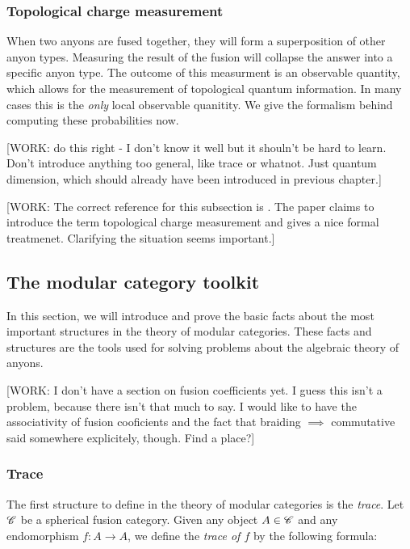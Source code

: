 \subsubsection{Topological charge measurement}

When two anyons are fused together, they will form a superposition of other anyon types. Measuring the result of the fusion will collapse the answer into a specific anyon type. The outcome of this measurment is an observable quantity, which allows for the measurement of topological quantum information. In many cases this is the \textit{only} local observable quanitity. We give the formalism behind computing these probabilities now.

[WORK: do this right - I don't know it well but it shouln't be hard to learn. Don't introduce anything too general, like trace or whatnot. Just quantum dimension, which should already have been introduced in previous chapter.]

[WORK: The correct reference for this subsection is \cite{bonderson2021measuring}. The paper \cite{cong2017universal} claims to introduce the term topological charge measurement and gives a nice formal treatmenet. Clarifying the situation seems important.]
 


\subsection{The modular category toolkit}

In this section, we will introduce and prove the basic facts about the most important structures in the theory of modular categories. These facts and structures are the tools used for solving problems about the algebraic theory of anyons. 

[WORK: I don't have a section on fusion coefficients yet. I guess this isn't a problem, because there isn't that much to say. I would like to have the associativity of fusion cooficients and the fact that braiding $\implies$ commutative said somewhere explicitely, though. Find a place?]

\subsubsection{Trace}

The first structure to define in the theory of modular categories is the \textit{trace}. Let $\mathscr{C}$ be a spherical fusion category. Given any object $A\in \mathscr{C}$ and any endomorphism $f:A\to A$, we define the \textit{trace of $f$} by the following formula:


